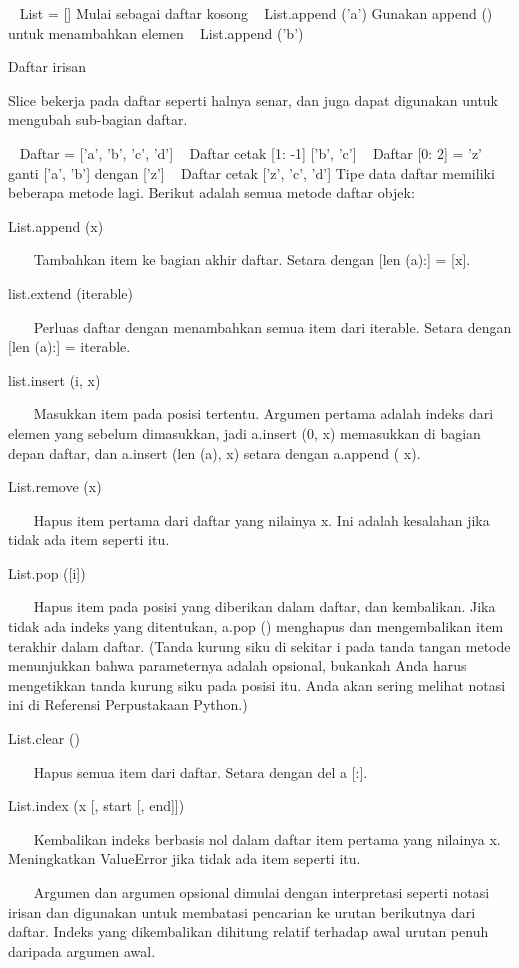 ~ List = []            Mulai sebagai daftar kosong 
~ List.append ('a')            Gunakan append () untuk menambahkan elemen 
~ List.append ('b') 

Daftar irisan 

Slice bekerja pada daftar seperti halnya senar, dan juga dapat digunakan untuk mengubah sub-bagian daftar. 

~ Daftar = ['a', 'b', 'c', 'd'] 
~ Daftar cetak [1: -1]            ['b', 'c'] 
~ Daftar [0: 2] = 'z'            ganti ['a', 'b'] dengan ['z'] 
~ Daftar cetak            ['z', 'c', 'd'] 
Tipe data daftar memiliki beberapa metode lagi. Berikut adalah semua metode daftar objek: 

List.append (x) 

~~~ Tambahkan item ke bagian akhir daftar. Setara dengan [len (a):] = [x]. 

list.extend (iterable) 

~~~ Perluas daftar dengan menambahkan semua item dari iterable. Setara dengan [len (a):] = iterable. 

list.insert (i, x) 

~~~ Masukkan item pada posisi tertentu. Argumen pertama adalah indeks dari elemen yang sebelum dimasukkan, jadi a.insert (0, x) memasukkan di bagian depan daftar, dan a.insert (len (a), x) setara dengan a.append ( x). 

List.remove (x) 

~~~ Hapus item pertama dari daftar yang nilainya x. Ini adalah kesalahan jika tidak ada item seperti itu. 

List.pop ([i]) 

~~~ Hapus item pada posisi yang diberikan dalam daftar, dan kembalikan. Jika tidak ada indeks yang ditentukan, a.pop () menghapus dan mengembalikan item terakhir dalam daftar. (Tanda kurung siku di sekitar i pada tanda tangan metode menunjukkan bahwa parameternya adalah opsional, bukankah Anda harus mengetikkan tanda kurung siku pada posisi itu. Anda akan sering melihat notasi ini di Referensi Perpustakaan Python.) 

List.clear () 

~~~ Hapus semua item dari daftar. Setara dengan del a [:]. 

List.index (x [, start [, end]]) 

~~~ Kembalikan indeks berbasis nol dalam daftar item pertama yang nilainya x. Meningkatkan ValueError jika tidak ada item seperti itu. 

~~~ Argumen dan argumen opsional dimulai dengan interpretasi seperti notasi irisan dan digunakan untuk membatasi pencarian ke urutan berikutnya dari daftar. Indeks yang dikembalikan dihitung relatif terhadap awal urutan penuh daripada argumen awal. 

